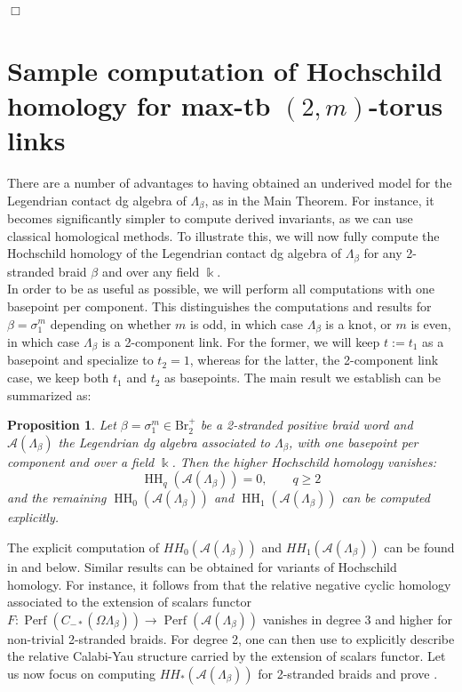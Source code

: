 \documentclass[11pt]{article}
\newtheorem{proposition}[theorem]{Proposition}
\newcommand{\kk}{\Bbbk}
\newcommand{\La}{\Lambda}
\newcommand{\SA}{\mathcal A}
\newcommand{\lr}{\longrightarrow}
\newcommand{\HH}{\operatorname{HH}}
\newcommand{\Perf}{\operatorname{Perf}}
\begin{document}
\hfill$\Box$

\section{Sample computation of Hochschild homology for max-tb $(2,m)$-torus links}\label{sec:examples_applications}

There are a number of advantages to having obtained an underived model for the Legendrian contact dg algebra of $\La_\beta$, as in the Main Theorem. For instance, it becomes significantly simpler to compute derived invariants, as we can use classical homological methods. To illustrate this, we will now fully compute the Hochschild homology of the Legendrian contact dg algebra of $\La_\beta$ for any 2-stranded braid $\beta$ and over any field $\kk$.\\

In order to be as useful as possible, we will perform all computations with one basepoint per component. This distinguishes the computations and results for $\beta=\sigma_1^m$ depending on whether $m$ is odd, in which case $\La_\beta$ is a knot, or $m$ is even, in which case $\La_\beta$ is a 2-component link. For the former, we will keep $t:=t_1$ as a basepoint and specialize to $t_2=1$, whereas for the latter, the 2-component link case, we keep both $t_1$ and $t_2$ as basepoints. The main result we establish can be summarized as:

\begin{proposition}\label{prop:Hochschild_2stranded} Let $\beta=\sigma_1^m\in\mbox{Br}_2^+$ be a 2-stranded positive braid word and $\SA(\La_\beta)$ the Legendrian dg algebra associated to $\La_\beta$, with one basepoint per component and over a field $\kk$. Then the higher Hochschild homology vanishes:
$$\HH_q(\SA(\La_\beta))=0,\qquad q\geq2$$
and the remaining $\HH_0(\SA(\La_\beta))$ and $\HH_1(\SA(\La_\beta))$ can be computed explicitly.
\end{proposition}

\noindent The explicit computation of $HH_0(\SA(\La_\beta))$ and $HH_1(\SA(\La_\beta))$ can be found in  and  below. Similar results can be obtained for variants of Hochschild homology. For instance, it follows from  that the relative negative cyclic homology associated to the extension of scalars functor $F:\Perf(C_{-*}(\Omega\La_\beta))\lr\Perf(\SA(\La_\beta))$ vanishes in degree 3 and higher for non-trivial 2-stranded braids. For degree 2, one can then use \cite[Section 3.1]{CGGS24} to explicitly describe the relative Calabi-Yau structure carried by the extension of scalars functor. Let us now focus on computing $HH_*(\SA(\La_\beta))$ for 2-stranded braids and prove .
\end{document}

